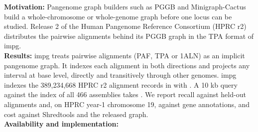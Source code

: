 \textbf{Motivation:}
Pangenome graph builders such as PGGB and Minigraph-Cactus build a whole-chromosome or whole-genome graph before one locus can be studied.
Release 2 of the Human Pangenome Reference Consortium (HPRC r2) distributes the pairwise alignments behind its PGGB graph in the TPA format of impg.
\\
\textbf{Results:}
impg treats pairwise alignments (PAF, TPA or 1ALN) as an implicit pangenome graph.
It indexes each alignment in both directions and projects any interval at base level, directly and transitively through other genomes.
impg indexes the 389,234,668 HPRC r2 alignment records in  with .
A 10 kb query against the index of all 466 assemblies takes .
We report recall against held-out alignments and, on HPRC year-1 chromosome 19, against gene annotations, and cost against Shredtools and the released graph.
\\
\textbf{Availability and implementation:}

